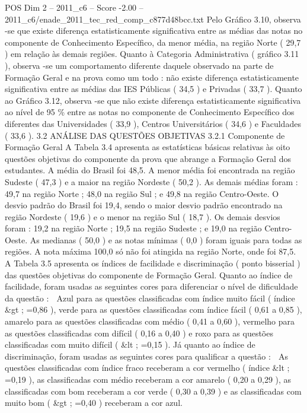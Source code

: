 \begin{textsample}{POS Dim 2 – 2011\_c6 – Score -2.00 – 2011\_c6/enade\_2011\_tec\_red\_comp\_c877d48bcc.txt}
Pelo Gráfico 3.10, observa -se que existe diferença estatisticamente significativa entre as médias das notas no componente de Conhecimento Específico, da menor média, na região Norte ( 29,7 ) em relação às demais regiões.
Quanto à Categoria Administrativa ( gráfico 3.11 ), observa -se um comportamento diferente daquele observado na parte de Formação Geral e na prova como um todo : não existe diferença estatisticamente significativa entre as médias das IES Públicas ( 34,5 ) e Privadas ( 33,7 ).
Quanto ao Gráfico 3.12, observa -se que não existe diferença estatisticamente significativa ao nível de 95 \% entre as notas no componente de Conhecimento Específico dos diferentes das Universidades ( 33,9 ), Centros Universitários ( 34,6 ) e Faculdades ( 33,6 ). 3.2 ANÁLISE DAS QUESTÕES OBJETIVAS 3.2.1 Componente de Formação Geral A Tabela 3.4 apresenta as estatísticas básicas relativas às oito questões objetivas do componente da prova que abrange a Formação Geral dos estudantes.
A média do Brasil foi 48,5.
A menor média foi encontrada na região Sudeste ( 47,3 ) e a maior na região Nordeste ( 50,2 ).
As demais médias foram : 49,7 na região Norte ; 48,0 na região Sul ; e 49,8 na região Centro-Oeste.
O desvio padrão do Brasil foi 19,4, sendo o maior desvio padrão encontrado na região Nordeste ( 19,6 ) e o menor na região Sul ( 18,7 ).
Os demais desvios foram : 19,2 na região Norte ; 19,5 na região Sudeste ; e 19,0 na região Centro-Oeste.
As medianas ( 50,0 ) e as notas mínimas ( 0,0 ) foram iguais para todas as regiões.
A nota máxima 100,0 só não foi atingida na região Norte, onde foi 87,5.
A Tabela 3.5 apresenta os índices de facilidade e discriminação ( ponto bisserial ) das questões objetivas do componente de Formação Geral.
Quanto ao índice de facilidade, foram usadas as seguintes cores para diferenciar o nível de dificuldade da questão :  Azul para as questões classificadas com índice muito fácil ( índice \&gt ; =0,86 ), verde para as questões classificadas com índice fácil ( 0,61 a 0,85 ), amarelo para as questões classificadas com médio ( 0,41 a 0,60 ), vermelho para as questões classificadas com difícil ( 0,16 a 0,40 ) e roxo para as questões classificadas com muito difícil ( \&lt ; =0,15 ).
Já quanto ao índice de discriminação, foram usadas as seguintes cores para qualificar a questão :  As questões classificadas com índice fraco receberam a cor vermelho ( índice \&lt ; =0,19 ), as classificadas com médio receberam a cor amarelo ( 0,20 a 0,29 ), as classificadas com bom receberam a cor verde ( 0,30 a 0,39 ) e as classificadas com muito bom ( \&gt ; =0,40 ) receberam a cor azul.

\end{textsample}
